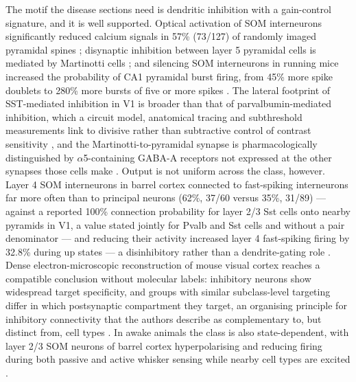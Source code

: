 \documentclass[11pt]{article}
\begin{document}
The motif the disease sections need is dendritic inhibition with a gain-control signature, and it is well supported. Optical activation of SOM interneurons significantly reduced calcium signals in 57\% (73/127) of randomly imaged pyramidal spines \citep{Chiu2013}; disynaptic inhibition between layer 5 pyramidal cells is mediated by Martinotti cells \citep{Silberberg2007}; and silencing SOM interneurons in running mice increased the probability of CA1 pyramidal burst firing, from 45\% more spike doublets to 280\% more bursts of five or more spikes \citep{Royer2012}. The lateral footprint of SST-mediated inhibition in V1 is broader than that of parvalbumin-mediated inhibition, which a circuit model, anatomical tracing and subthreshold measurements link to divisive rather than subtractive control of contrast sensitivity \citep{DelRosario2025}, and the Martinotti-to-pyramidal synapse is pharmacologically distinguished by $\alpha$5-containing GABA-A receptors not expressed at the other synapses those cells make \citep{Donato2022}. Output is not uniform across the class, however. Layer 4 SOM interneurons in barrel cortex connected to fast-spiking interneurons far more often than to principal neurons (62\%, 37/60 versus 35\%, 31/89) --- against a reported 100\% connection probability for layer 2/3 Sst cells onto nearby pyramids in V1, a value stated jointly for Pvalb and Sst cells and without a pair denominator \citep{Pfeffer2013} --- and reducing their activity increased layer 4 fast-spiking firing by 32.8\% during up states --- a disinhibitory rather than a dendrite-gating role \citep{Xu2013}. Dense electron-microscopic reconstruction of mouse visual cortex reaches a compatible conclusion without molecular labels: inhibitory neurons show widespread target specificity, and groups with similar subclass-level targeting differ in which postsynaptic compartment they target, an organising principle for inhibitory connectivity that the authors describe as complementary to, but distinct from, cell types \citep{SchneiderMizell2025}. In awake animals the class is also state-dependent, with layer 2/3 SOM neurons of barrel cortex hyperpolarising and reducing firing during both passive and active whisker sensing while nearby cell types are excited \citep{Gentet2012}.
\end{document}
